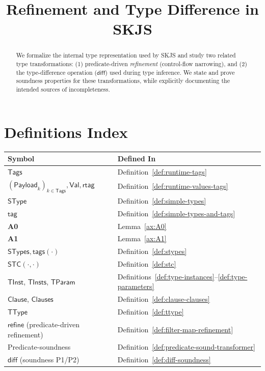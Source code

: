 \documentclass[11pt]{article}
\title{Refinement and Type Difference in SKJS}
\author{}
\date{}
\newcommand{\diff}{\mathsf{diff}}
\newcommand{\refineop}{\mathsf{refine}}
\newcommand{\SType}{\mathsf{SType}}
\newcommand{\Tags}{\mathsf{Tags}}
\newcommand{\TType}{\mathsf{TType}}
\newcommand{\Clauses}{\mathsf{Clauses}}
\newcommand{\Clause}{\mathsf{Clause}}
\newcommand{\STypes}{\mathsf{STypes}}
\newcommand{\TInst}{\mathsf{TInst}}
\newcommand{\TInsts}{\mathsf{TInsts}}
\newcommand{\TParam}{\mathsf{TParam}}
\newcommand{\tagfn}{\mathsf{tag}}
\newcommand{\tags}{\mathsf{tags}}
\newcommand{\rtag}{\mathsf{rtag}}
\newcommand{\Val}{\mathsf{Val}}
\newcommand{\Payload}{\mathsf{Payload}}
\begin{document}
\maketitle

\begin{abstract}
We formalize the internal type representation used by SKJS and study two related
type transformations:
(1) predicate-driven \emph{refinement} (control-flow narrowing), and
(2) the type-difference operation ($\diff$) used during type inference.
We state and prove soundness properties for these transformations, while
explicitly documenting the intended sources of incompleteness.
\end{abstract}

\section{Definitions Index}

\renewcommand{\arraystretch}{1.15}
\begin{center}
\begin{tabular}{ll}
\textbf{Symbol} & \textbf{Defined In} \\
\hline
$\Tags$ & Definition~\ref{def:runtime-tags} \\
$(\Payload_k)_{k\in\Tags}, \Val, \rtag$ & Definition~\ref{def:runtime-values-tags} \\
$\SType$ & Definition~\ref{def:simple-types} \\
$\tagfn$ & Definition~\ref{def:simple-types-and-tags} \\
\textbf{A0} & Lemma~\ref{ax:A0} \\
\textbf{A1} & Lemma~\ref{ax:A1} \\
$\STypes, \tags(\cdot)$ & Definition~\ref{def:stypes} \\
$\mathsf{STC}(\cdot,\cdot)$ & Definition~\ref{def:stc} \\
$\TInst$, $\TInsts$, $\TParam$ & Definitions~\ref{def:type-instances}--\ref{def:type-parameters} \\
$\Clause$, $\Clauses$ & Definition~\ref{def:clause-clauses} \\
$\TType$ & Definition~\ref{def:ttype} \\
$\refineop$ (predicate-driven refinement) & Definition~\ref{def:filter-map-refinement} \\
Predicate-soundness & Definition~\ref{def:predicate-sound-transformer} \\
$\diff$ (soundness P1/P2) & Definition~\ref{def:diff-soundness} \\
\end{tabular}
\end{center}
\end{document}
